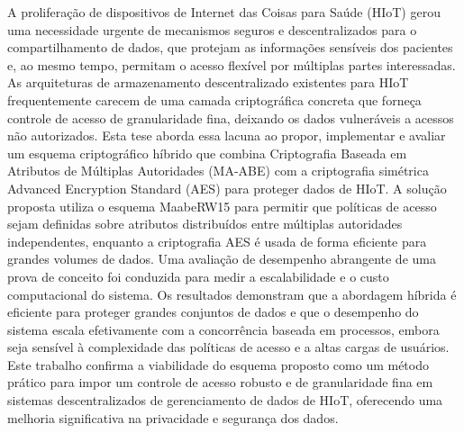 \documentclass[cic,tc,english]{iiufrgs}
\numberwithin{algorithm}{chapter}
\begin{document}
\begin{translatedabstract}
    A proliferação de dispositivos de Internet das Coisas para Saúde (HIoT) gerou uma necessidade urgente de mecanismos seguros e descentralizados para o compartilhamento de dados, que protejam as informações sensíveis dos pacientes e, ao mesmo tempo, permitam o acesso flexível por múltiplas partes interessadas. As arquiteturas de armazenamento descentralizado existentes para HIoT frequentemente carecem de uma camada criptográfica concreta que forneça controle de acesso de granularidade fina, deixando os dados vulneráveis a acessos não autorizados. Esta tese aborda essa lacuna ao propor, implementar e avaliar um esquema criptográfico híbrido que combina Criptografia Baseada em Atributos de Múltiplas Autoridades (MA-ABE) com a criptografia simétrica Advanced Encryption Standard (AES) para proteger dados de HIoT. A solução proposta utiliza o esquema MaabeRW15 para permitir que políticas de acesso sejam definidas sobre atributos distribuídos entre múltiplas autoridades independentes, enquanto a criptografia AES é usada de forma eficiente para grandes volumes de dados. Uma avaliação de desempenho abrangente de uma prova de conceito foi conduzida para medir a escalabilidade e o custo computacional do sistema. Os resultados demonstram que a abordagem híbrida é eficiente para proteger grandes conjuntos de dados e que o desempenho do sistema escala efetivamente com a concorrência baseada em processos, embora seja sensível à complexidade das políticas de acesso e a altas cargas de usuários. Este trabalho confirma a viabilidade do esquema proposto como um método prático para impor um controle de acesso robusto e de granularidade fina em sistemas descentralizados de gerenciamento de dados de HIoT, oferecendo uma melhoria significativa na privacidade e segurança dos dados.
\end{translatedabstract}

\listoffigures

\listoftables

\listofalgorithms
\end{document}
